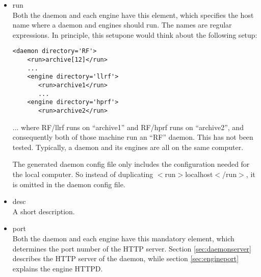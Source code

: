 \begin{itemize}
\item run\\
      Both the daemon and each engine have this element, which
      specifies the host name where a daemon and engines should run.
      The names are regular expressions.
      In principle, this setupone would think about the following setup:
\begin{lstlisting}[keywordstyle=\sffamily]
 <daemon directory='RF'>
    <run>archive[12]</run>
    ...
    <engine directory='llrf'> 
       <run>archive1</run>
       ...
    <engine directory='hprf'> 
       <run>archive2</run>
\end{lstlisting}
      ... where RF/llrf runs on ``archive1'' and RF/hprf runs on
      ``archive2'', and consequently both of those machine run an ``RF'' daemon.
      This has not been tested. Typically, a daemon and its engines
      are all on the same computer.

      The generated daemon config file only includes the configuration
      needed for the local computer.  So instead of duplicating
      $<$run$>$localhost$<$/run$>$, it is omitted in the daemon config file.
\item desc\\
      A short description.
\item port\\
      Both the daemon and each engine have this mandatory element, which
      determines the port number of the HTTP server. Section
      \ref{sec:daemonserver} describes the HTTP server of the daemon, while
      section \ref{sec:engineport} explains the engine HTTPD.


\end{itemize}
